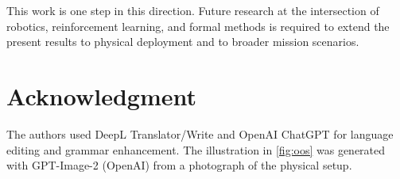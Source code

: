 \documentclass{ieeeaccess}
\begin{document}

This work is one step in this direction. Future research at the intersection
of robotics, reinforcement learning, and formal methods is required to extend the present results
to physical deployment and to broader mission scenarios.

\section*{Acknowledgment}
The authors used DeepL Translator/Write and OpenAI ChatGPT
for language editing and grammar enhancement. The illustration in \cref{fig:oos} was
generated with GPT-Image-2 (OpenAI) from a photograph of the physical setup.
\end{document}
